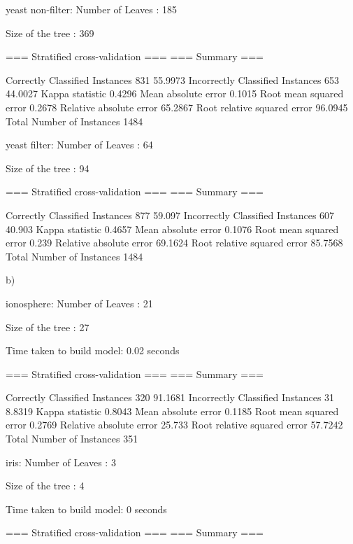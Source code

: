 yeast non-filter:
Number of Leaves  : 	185

Size of the tree : 	369


=== Stratified cross-validation ===
=== Summary ===

Correctly Classified Instances         831               55.9973 %
Incorrectly Classified Instances       653               44.0027 %
Kappa statistic                          0.4296
Mean absolute error                      0.1015
Root mean squared error                  0.2678
Relative absolute error                 65.2867 %
Root relative squared error             96.0945 %
Total Number of Instances             1484     



yeast filter:
Number of Leaves  : 	64

Size of the tree : 	94

=== Stratified cross-validation ===
=== Summary ===

Correctly Classified Instances         877               59.097  %
Incorrectly Classified Instances       607               40.903  %
Kappa statistic                          0.4657
Mean absolute error                      0.1076
Root mean squared error                  0.239 
Relative absolute error                 69.1624 %
Root relative squared error             85.7568 %
Total Number of Instances             1484     



b)

ionosphere:
Number of Leaves  : 	21

Size of the tree : 	27


Time taken to build model: 0.02 seconds

=== Stratified cross-validation ===
=== Summary ===

Correctly Classified Instances         320               91.1681 %
Incorrectly Classified Instances        31                8.8319 %
Kappa statistic                          0.8043
Mean absolute error                      0.1185
Root mean squared error                  0.2769
Relative absolute error                 25.733  %
Root relative squared error             57.7242 %
Total Number of Instances              351     



iris:
Number of Leaves  : 	3

Size of the tree : 	4


Time taken to build model: 0 seconds

=== Stratified cross-validation ===
=== Summary ===

